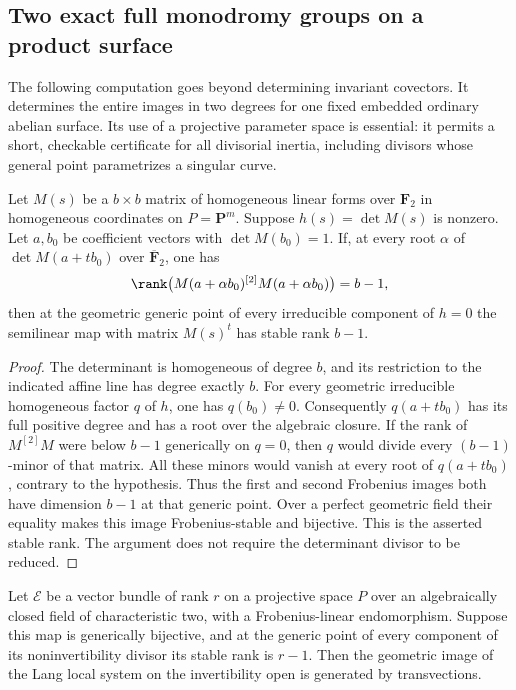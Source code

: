 \subsection{Two exact full monodromy groups on a product surface}
\label{subsec:product-full-groups}

The following computation goes beyond determining invariant covectors.
It determines the entire images in two degrees for one fixed embedded
ordinary abelian surface.  Its use of a projective parameter space is
essential: it permits a short, checkable certificate for all divisorial
inertia, including divisors whose general point parametrizes a singular
curve.

\begin{lemma}
\label{lem:hasse-line-certificate}
Let $M(s)$ be a $b\times b$ matrix of homogeneous linear forms over
$\mathbf F_2$ in homogeneous coordinates on $P=\mathbf P^m$.
Suppose $h(s)=\det M(s)$ is nonzero.  Let $a,b_0$ be coefficient
vectors with $\det M(b_0)=1$.  If, at every root $\alpha$ of
$\det M(a+t b_0)$ over $\overline{\mathbf F}_2$, one has
\[
 \rank\bigl(M(a+\alpha b_0)^{[2]}M(a+\alpha b_0)\bigr)=b-1,
\]
then at the geometric generic point of every irreducible component
of $h=0$ the semilinear map with matrix $M(s)^t$ has stable rank
$b-1$.
\end{lemma}

\begin{proof}
The determinant is homogeneous of degree $b$, and its restriction to
the indicated affine line has degree exactly $b$.  For every geometric
irreducible homogeneous factor $q$ of $h$, one has $q(b_0)\ne0$.
Consequently $q(a+t b_0)$ has its full positive degree and has a root
over the algebraic closure.  If the rank of $M^{[2]}M$ were below
$b-1$ generically on $q=0$, then $q$ would divide every $(b-1)$-minor
of that matrix.  All these minors would vanish at every root of
$q(a+t b_0)$, contrary to the hypothesis.  Thus the first and second
Frobenius images both have dimension $b-1$ at that generic point.
Over a perfect geometric field their equality makes this image
Frobenius-stable and bijective.  This is the asserted stable rank.
The argument does not require the determinant divisor to be reduced.
\end{proof}

\begin{lemma}
\label{lem:char2-defect-one-inertia}
Let $\mathcal E$ be a vector bundle of rank $r$ on a projective space
$P$ over an algebraically closed field of characteristic two, with
a Frobenius-linear endomorphism.  Suppose this map is generically
bijective, and at the generic point of every component of its
noninvertibility divisor its stable rank is $r-1$.
Then the geometric image of the Lang local system on the
invertibility open is generated by transvections.
\end{lemma}

